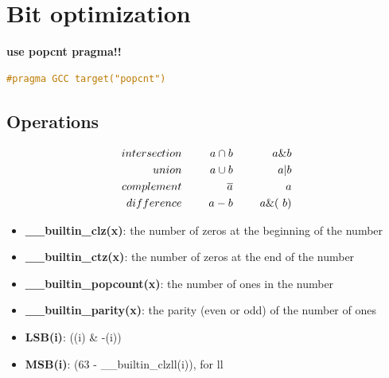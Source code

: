 \section{Bit optimization}

    \textbf{use popcnt pragma!!}

    \begin{lstlisting}[language=c++]
    #pragma GCC target("popcnt")
    \end{lstlisting}

    \subsection{Operations}

    \begin{align*}
        intersection & \hspace{5mm} & a \cap b     & \hspace{5mm} &  a \& b \\
        union        & \hspace{5mm} & a  \cup b    & \hspace{5mm} &  a | b \\
        complement   & \hspace{5mm} & \overline{a} & \hspace{5mm} &  ~a \\
        difference   & \hspace{5mm} & a - b        & \hspace{5mm} &  a \& (~b) \\
    \end{align*}

    \begin{itemize} 
        \item \textbf{\_\_builtin\_clz(x)}: the number of zeros at the beginning of the number
        \item \textbf{\_\_builtin\_ctz(x)}: the number of zeros at the end of the number
        \item \textbf{\_\_builtin\_popcount(x)}: the number of ones in the number
        \item \textbf{\_\_builtin\_parity(x)}: the parity (even or odd) of the number of ones

        \item \textbf{LSB(i)}: ((i) \& -(i))
        \item \textbf{MSB(i)}: (63 - \_\_builtin\_clzll(i)), for ll
    \end{itemize}
    

